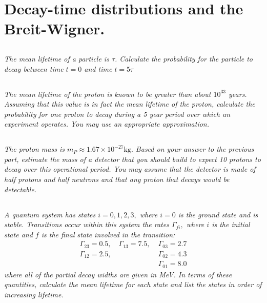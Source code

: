 \documentclass{article}
\begin{document}
\section{Decay-time distributions and the Breit-Wigner.}
\subsection{}
\textit{The mean lifetime of a particle is $\tau$. Calculate the probability for the particle to decay between time $t=0$ and time $t=5 \tau$}
\subsection{}
\textit{The mean lifetime of the proton is known to be greater than about $10^{33}$ years. Assuming that this value is in fact the mean lifetime of the proton, calculate the probability for one proton to decay during a 5 year period over which an experiment operates. You may use an appropriate approximation.}


\subsection{}
\textit{The proton mass is $m_{P} \approx 1.67 \times 10^{-27} \mathrm{kg} .$ Based on your answer to the previous part, estimate the mass of a detector that you should build to expect 10 protons to decay over this operational period. You may assume that the detector is made of half protons and half neutrons and that any proton that decays would be detectable.}


\subsection{}
\textit{A quantum system has states $i=0,1,2,3,$ where $i=0$ is the ground state and is stable. Transitions occur within this system the rates $\Gamma_{f i},$ where $i$ is the initial state and $f$ is the final state involved in the transition:
$$
\begin{aligned}
\Gamma_{23}=0.5, \quad \Gamma_{13}=7.5, \;& \Gamma_{03}=2.7 \\
\Gamma_{12}=2.5, \; & \Gamma_{02}=4.3 \\
&\Gamma_{01}= 8.0
\end{aligned}
$$
where all of the partial decay widths are given in MeV. In terms of these quantities, calculate the mean lifetime for each state and list the states in order of increasing lifetime.}
\end{document}
